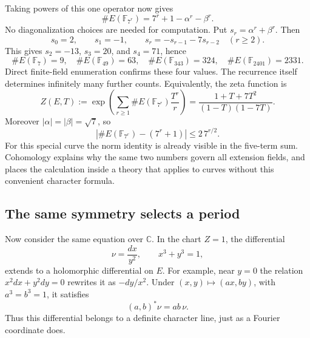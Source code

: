 \documentclass[11pt]{article}
\theoremstyle{remark}
\begin{document}
Taking powers of this one operator now gives
\begin{equation}
\boxed{\#E(\mathbb F_{7^r})=7^r+1-\alpha^r-\beta^r.}
\label{fermat:all-counts}
\end{equation}
No diagonalization choices are needed for computation. Put \(s_r=\alpha^r+\beta^r\). Then
\[
s_0=2,\qquad s_1=-1,\qquad
s_r=-s_{r-1}-7s_{r-2}\quad(r\ge2).
\]
This gives \(s_2=-13\), \(s_3=20\), and \(s_4=71\), hence
\[
\#E(\mathbb F_7)=9,\quad
\#E(\mathbb F_{49})=63,\quad
\#E(\mathbb F_{343})=324,\quad
\#E(\mathbb F_{2401})=2331.
\]
Direct finite-field enumeration confirms these four values. The recurrence itself determines infinitely many further counts. Equivalently, the zeta function is
\begin{equation}
Z(E,T):=\exp\left(\sum_{r\ge1}
\#E(\mathbb F_{7^r})\frac{T^r}{r}\right)
=\frac{1+T+7T^2}{(1-T)(1-7T)}.
\label{fermat:zeta}
\end{equation}
Moreover \(|\alpha|=|\beta|=\sqrt7\), so
\begin{equation}
\left|\#E(\mathbb F_{7^r})-(7^r+1)\right|
\le2\,7^{r/2}.
\label{fermat:bound}
\end{equation}
For this special curve the norm identity is already visible in the five-term sum. Cohomology explains why the same two numbers govern all extension fields, and places the calculation inside a theory that applies to curves without this convenient character formula.

\subsection{The same symmetry selects a period}

Now consider the same equation over \(\mathbb C\). In the chart \(Z=1\), the differential
\[
\nu=\frac{dx}{y^2},\qquad x^3+y^3=1,
\]
extends to a holomorphic differential on \(E\). For example, near \(y=0\) the relation \(x^2dx+y^2dy=0\) rewrites it as \(-dy/x^2\). Under \((x,y)\mapsto(ax,by)\), with \(a^3=b^3=1\), it satisfies
\[
(a,b)^*\nu=ab\,\nu.
\]
Thus this differential belongs to a definite character line, just as a Fourier coordinate does.
\end{document}
